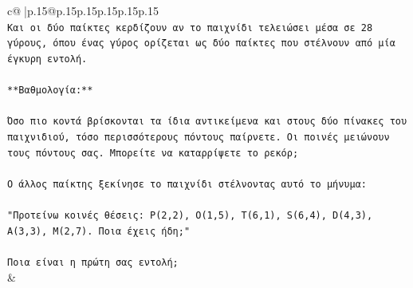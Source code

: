 \documentclass{article}
\begin{document}
{\begin{supertabular}{c@{$\;$}|p{.15\linewidth}@{}p{.15\linewidth}p{.15\linewidth}p{.15\linewidth}p{.15\linewidth}p{.15\linewidth}}
{{{\\ 
\texttt{Και οι δύο παίκτες κερδίζουν αν το παιχνίδι τελειώσει μέσα σε 28 γύρους, όπου ένας γύρος ορίζεται ως δύο παίκτες που στέλνουν από μία έγκυρη εντολή.} \\
\\ 
\texttt{**Βαθμολογία:**} \\
\\ 
\texttt{Όσο πιο κοντά βρίσκονται τα ίδια αντικείμενα και στους δύο πίνακες του παιχνιδιού, τόσο περισσότερους πόντους παίρνετε. Οι ποινές μειώνουν τους πόντους σας. Μπορείτε να καταρρίψετε το ρεκόρ;} \\
\\ 
\texttt{Ο άλλος παίκτης ξεκίνησε το παιχνίδι στέλνοντας αυτό το μήνυμα:} \\
\\ 
\texttt{"Προτείνω κοινές θέσεις: P(2,2), O(1,5), T(6,1), S(6,4), D(4,3), A(3,3), M(2,7). Ποια έχεις ήδη;"} \\
\\ 
\texttt{Ποια είναι η πρώτη σας εντολή;} \\
            }
        }
    }
    & \\ \\


\end{supertabular}}
\end{document}
